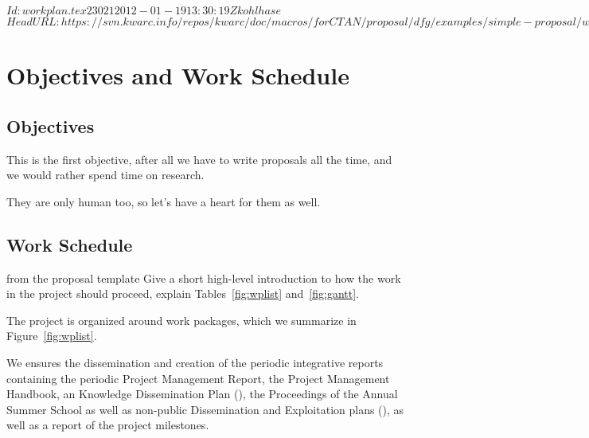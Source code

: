 \svnInfo $Id: workplan.tex 23021 2012-01-19 13:30:19Z kohlhase $
\svnKeyword $HeadURL: https://svn.kwarc.info/repos/kwarc/doc/macros/forCTAN/proposal/dfg/examples/simple-proposal/workplan.tex $
\section{Objectives and Work Schedule }

\subsection{Objectives}

\begin{objective}[id=firstobj,title=Supporting Authors]
  This is the first objective, after all we have to write proposals all the time, and we
  would rather spend time on research. 
\end{objective}

\begin{objective}[id=secondobj,title=Supporting Reviewers]
  They are only human too, so let's have a heart for them as well. 
\end{objective}

\subsection{Work Schedule} 
\begin{todo}{from the proposal template}
  Give a short high-level introduction to how the work in the project should proceed,
  explain Tables~\ref{fig:wplist} and~\ref{fig:gantt}.
\end{todo}
The project is organized around  work packages, which we summarize in
Figure~\ref{fig:wplist}. 

\wpfig

We ensures the dissemination and creation of the periodic integrative reports containing
the periodic Project Management Report, the Project Management Handbook, an Knowledge
Dissemination Plan ({}), the Proceedings of the Annual {\pn} Summer
School as well as non-public Dissemination and Exploitation plans ({}), as
well as a report of the {\pn} project milestones.

